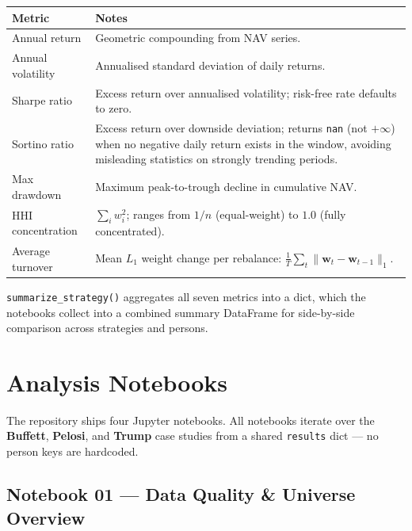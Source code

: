 \documentclass[11pt, a4paper]{article}
\newcommand{\code}[1]{\texttt{#1}}
\begin{document}
\medskip
\begin{center}
\begin{tabular}{@{}L{3.6cm} L{9.5cm}@{}}
  \toprule
  \textbf{Metric} & \textbf{Notes} \\
  \midrule
  Annual return    & Geometric compounding from NAV series. \\
  Annual volatility & Annualised standard deviation of daily returns. \\
  Sharpe ratio     & Excess return over annualised volatility; risk-free
                     rate defaults to zero. \\
  Sortino ratio    & Excess return over downside deviation; returns
                     \code{nan} (not $+\infty$) when no negative daily
                     return exists in the window, avoiding misleading
                     statistics on strongly trending periods. \\
  Max drawdown     & Maximum peak-to-trough decline in cumulative NAV. \\
  HHI concentration & $\sum_i w_i^2$; ranges from $1/n$ (equal-weight)
                     to $1.0$ (fully concentrated). \\
  Average turnover  & Mean $L_1$ weight change per rebalance:
                     $\frac{1}{T}\sum_t \|\bm{w}_t - \bm{w}_{t-1}\|_1$. \\
  \bottomrule
\end{tabular}
\end{center}

\code{summarize\_strategy()} aggregates all seven metrics into a dict, which
the notebooks collect into a combined summary DataFrame for side-by-side
comparison across strategies and persons.

\section{Analysis Notebooks}

The repository ships four Jupyter notebooks. All notebooks iterate over the
\textbf{Buffett}, \textbf{Pelosi}, and \textbf{Trump} case studies from a
shared \code{results} dict --- no person keys are hardcoded.

\subsection{Notebook 01 --- Data Quality \& Universe Overview}
\end{document}
